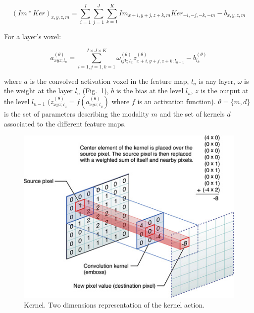 \documentclass[final, paper=letter,5p,times,twocolumn]{elsarticle}
\begin{document}
\begin{equation*}
    (Im*Ker)_{x,y,z,m} =  \sum_{i=1}^{I}\sum_{j=1}^{J}\sum_{k=1}^{K}Im_{x+i,y+j,z+k,m}Ker_{-i,-j,-k,-m} - b_{x,y,z,m}
  \label{eq:convolution_tot} 
\end{equation*}

For a layer's voxel:

\begin{equation}
    a_{xyz;l_{u}}^{(\theta)} =  \sum_{i=1,j=1,k=1}^{I \times J \times K}\omega_{ijk;l_{u}}^{(\theta)}z_{x+i,y+j,z+k;l_{u-1}}^{(\theta)} - b_{l_{k}}^{(\theta)}
  \label{eq:convolution_tot_vox} 
\end{equation}

where $a$ is the convolved activation voxel in the feature map, $l_{u}$ is any layer, $\omega$ is the weight at the layer $l_{u}$ (Fig.~\ref{fig:Kernel}), $b$ is the bias at the level $l_{u}$, $z$ is the output at the level $l_{u-1}$ ($z_{xyz;l_{u}}^{(\theta)} = f(a_{xyz;l_{u}}^{(\theta)})$ where $f$ is an activation function). $\theta = \{m,d\}$ is the set of parameters describing the modality $m$ and the set of kernels $d$ associated to the different feature maps.



\begin{figure}[htbp]
   \begin{center}
      \includegraphics[scale=0.3, angle=0]{images/GvsBA.jpg}
   \end{center}
   \caption{Kernel. Two dimensions representation of the kernel action.}
  \label{fig:Kernel} 
\end{figure}
\end{document}

